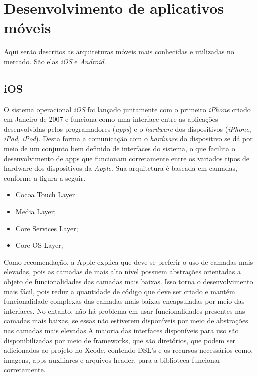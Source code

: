 \chapter{Desenvolvimento de aplicativos móveis}\label{referencialteorico}

Aqui serão descritos as arquiteturas móveis mais conhecidas e utilizadas no mercado. São elas \textit{iOS} e \textit{Android}.

\section{iOS}

O sistema operacional \textit{iOS} foi lançado juntamente com o primeiro \textit{iPhone} criado em Janeiro de 2007 e 
funciona como uma interface entre as aplicações desenvolvidas pelos programadores (\textit{apps}) e o \textit{hardware} 
dos dispositivos (\textit{iPhone}, \textit{iPad}, \textit{iPod}). Desta forma a comunicação com o \textit{hardware} do dispositivo se dá 
por meio de um conjunto bem definido de interfaces do sistema, o que facilita o desenvolvimento de apps 
que funcionam corretamente entre os variados tipos de hardware dos dispositivos da \textit{Apple}. Sua arquitetura 
é baseada em camadas, conforme a figura a seguir.
 

\begin{itemize}

	\item Cocoa Touch Layer
	\item Media Layer;
	\item Core Services Layer;
	\item Core OS Layer;

\end{itemize}

Como recomendação, a Apple explica que deve-se preferir o uso de camadas mais elevadas, pois as camadas de 
mais alto nível possuem abstrações orientadas a objeto de funcionalidades das camadas mais baixas. Isso 
torna o desenvolvimento mais fácil, pois reduz a quantidade de código que deve ser criado e mantém funcionalidade 
complexas das camadas mais baixas encapsuladas por meio das interfaces. No entanto, não há problema em usar 
funcionalidades presentes nas camadas mais baixas, se essas não estiverem disponíveis por meio de abstrações nas 
camadas mais elevadas.A maioria das interfaces disponíveis para uso são disponibilizadas por meio de frameworks, 
que são diretórios, que podem ser adicionados ao projeto no Xcode, contendo DSL's e os recursos necessários como, 
imagens, apps auxiliares e arquivos header, para a biblioteca funcionar corretamente.

